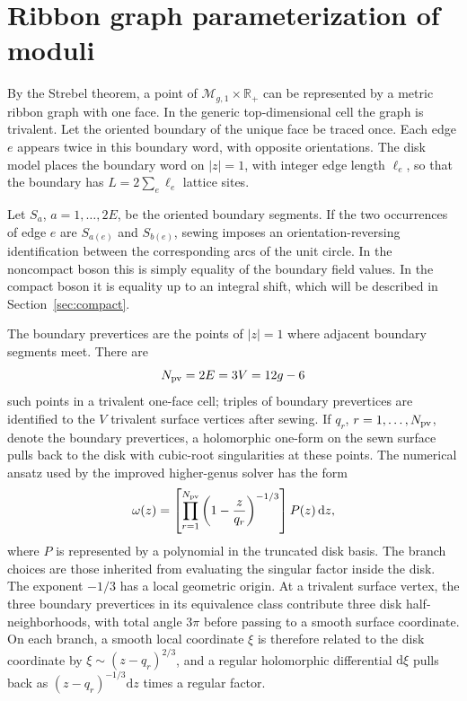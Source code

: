 \documentclass[11pt]{article}
\numberwithin{equation}{section}
\newcommand{\bR}{\mathbb R}
\newcommand{\cM}{\mathcal M}
\newcommand{\dd}{\mathrm d}
\begin{document}
\section{Ribbon graph parameterization of moduli}
\label{sec:ribbon-parameterization}

By the Strebel theorem, a point of \(\cM_{g,1}\times\bR_+\) can be represented
by a metric ribbon graph with one face.  In the generic top-dimensional cell
the graph is trivalent.  Let the oriented boundary of the unique face be traced
once.  Each edge \(e\) appears twice in this boundary word, with opposite
orientations.  The disk model places the boundary word on \(|z|=1\), with
integer edge length \(\ell_e\), so that the boundary has \(L=2\sum_e\ell_e\)
lattice sites.

Let \(S_a\), \(a=1,\ldots,2E\), be the oriented boundary segments.  If the two
occurrences of edge \(e\) are \(S_{a(e)}\) and \(S_{b(e)}\), sewing imposes an
orientation-reversing identification between the corresponding arcs of the
unit circle.  In the noncompact boson this is simply equality of the boundary
field values.  In the compact boson it is equality up to an integral shift,
which will be described in Section~\ref{sec:compact}.

The boundary prevertices are the points of \(|z|=1\) where adjacent boundary
segments meet.  There are
\[
        N_{\rm pv}=2E=3V=12g-6
\]
such points in a trivalent one-face cell; triples of boundary prevertices are
identified to the \(V\) trivalent surface vertices after sewing.  If
\(q_r\), \(r=1,\ldots,N_{\rm pv}\), denote the boundary prevertices, a
holomorphic one-form on the sewn surface pulls back to the disk with cubic-root
singularities at these points.  The numerical ansatz used by the improved
higher-genus solver has the form
\begin{equation}
        \omega(z)
        =
        \left[\prod_{r=1}^{N_{\rm pv}}
        \left(1-\frac{z}{q_r}\right)^{-1/3}\right]
        P(z)\,\dd z,
        \label{eq:oneformansatz}
\end{equation}
where \(P\) is represented by a polynomial in the truncated disk basis.  The
branch choices are those inherited from evaluating the singular factor inside
the disk.
The exponent \(-1/3\) has a local geometric origin.  At a trivalent surface
vertex, the three boundary prevertices in its equivalence class contribute
three disk half-neighborhoods, with total angle \(3\pi\) before passing to a
smooth surface coordinate.  On each branch, a smooth local coordinate \(\xi\)
is therefore related to the disk coordinate by
\(\xi\sim (z-q_r)^{2/3}\), and a regular holomorphic differential \(\dd\xi\)
pulls back as \((z-q_r)^{-1/3}\dd z\) times a regular factor.
\end{document}
